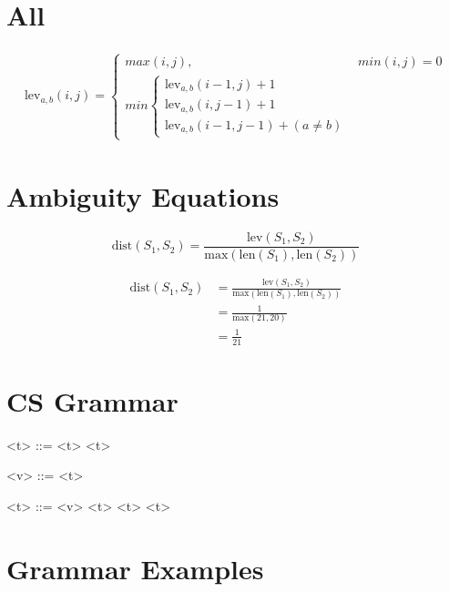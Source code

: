 \documentclass[11hpt]{article}
\begin{document}
\section{All}

\begin{align*}
  \text{lev}_{a,b}(i,j) =
  \begin{cases}
    max(i,j), &min(i,j) = 0 \\
    min
    \begin{cases}
      \text{lev}_{a,b}(i-1,j) + 1 \\
      \text{lev}_{a,b}(i,j-1) + 1 \\
      \text{lev}_{a,b}(i-1,j-1) + (a \neq b)
    \end{cases}
  \end{cases}
\end{align*}

\section{Ambiguity Equations}

\begin{equation*}
  \text{dist}(S_1, S_2) = \frac{\text{lev}(S_1, S_2)}{\text{max}(\text{len}(S_1), \text{len}(S_2))}
\end{equation*}

\begin{align*}
  \text{dist}(S_1, S_2) &= \frac{\text{lev}(S_1, S_2)}{\text{max}(\text{len}(S_1), \text{len}(S_2))} \\
               &= \frac{1}{\text{max}(21, 20)} \\
               &= \frac{1}{21}
\end{align*}

\section{CS Grammar}
\begin{grammar}
<\lambda t> ::= \lit*{() ->} <t>
  \alt \lit*{->} <t>

<v> ::= 
  \alt {}
  \alt <\lambda t>

<t> ::= <v>
  \alt <\lambda t>\lit*{()}
  \alt <t> <t>
\end{grammar}

\section{Grammar Examples}
\end{document}
